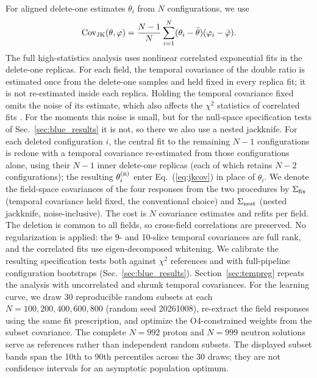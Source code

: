 \documentclass[aps,prd,reprint,twocolumn,superscriptaddress,nofootinbib,longbibliography]{revtex4-2}
\begin{document}
For aligned delete-one estimates $\theta_i$ from $N$ configurations, we use
\begin{equation}
\mathrm{Cov}_{\rm JK}(\theta,\varphi)=\frac{N-1}{N}
\sum_{i=1}^N(\theta_i-\bar\theta)(\varphi_i-\bar\varphi).
\label{eq:jkcov}
\end{equation}
The full high-statistics analysis uses nonlinear correlated exponential fits in the delete-one replicas. For each field, the temporal covariance of the double ratio is estimated once from the delete-one samples and held fixed in every replica fit; it is not re-estimated inside each replica. Holding the temporal covariance fixed omits the noise of its estimate, which also affects the $\chi^2$ statistics of correlated fits \cite{BrunoSommer2023}. For the moments this noise is small, but for the null-space specification tests of Sec.~\ref{sec:blue_results} it is not, so there we also use a nested jackknife. For each deleted configuration $i$, the central fit to the remaining $N-1$ configurations is redone with a temporal covariance re-estimated from those configurations alone, using their $N-1$ inner delete-one replicas (each of which retains $N-2$ configurations); the resulting $\theta^{(\rm n)}_i$ enter Eq.~(\ref{eq:jkcov}) in place of $\theta_i$. We denote the field-space covariances of the four responses from the two procedures by $\Sigma_{\rm fix}$ (temporal covariance held fixed, the conventional choice) and $\Sigma_{\rm nest}$ (nested jackknife, noise-inclusive). The cost is $N$ covariance estimates and refits per field. The deletion is common to all fields, so cross-field correlations are preserved. No regularization is applied: the 9- and 10-slice temporal covariances are full rank, and the correlated fits use eigen-decomposed whitening. We calibrate the resulting specification tests both against $\chi^2$ references and with full-pipeline configuration bootstraps (Sec.~\ref{sec:blue_results}). Section~\ref{sec:tempreg} repeats the analysis with uncorrelated and shrunk temporal covariances. For the learning curve, we draw 30 reproducible random subsets at each $N=100,200,400,600,800$ (random seed 20261008), re-extract the field responses using the same fit prescription, and optimize the O4-constrained weights from the subset covariance. The complete $N=992$ proton and $N=999$ neutron solutions serve as references rather than independent random subsets. The displayed subset bands span the 10th to 90th percentiles across the 30 draws; they are not confidence intervals for an asymptotic population optimum.
\end{document}
